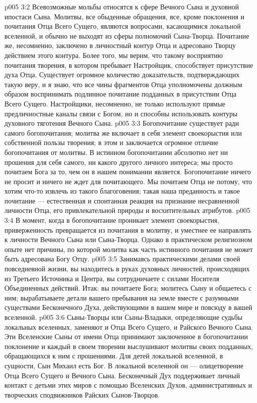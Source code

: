 \vs p005 3:2 Всевозможные мольбы относятся к сфере Вечного Сына и духовной ипостаси Сына. Молитвы, все обыденные обращения, все, кроме поклонения и почитания Отца Всего Сущего, являются вопросами, касающимися локальной вселенной, и обычно не выходят из сферы полномочий Сына\hyp{}Творца. Почитание же, несомненно, заключено в личностный контур Отца и адресовано Творцу действием этого контура. Более того, мы верим, что такому восприятию почитания творения, в котором пребывает Настройщик, способствует присутствие духа Отца. Существует огромное количество доказательств, подтверждающих такую веру, и я знаю, что все чины фрагментов Отца уполномочены должным образом воспринимать подлинное почитание подданных в присутствии Отца Всего Сущего. Настройщики, несомненно, не только используют прямые предличностные каналы связи с Богом, но и способны использовать контуры духовного тяготения Вечного Сына.
\vs p005 3:3 Богопочитание существует ради самого богопочитания; молитва же включает в себя элемент своекорыстия или собственной пользы творения; в этом и заключается огромное отличие богопочитания от молитвы. В истинном богопочитании абсолютно нет ни прошения для себя самого, ни какого другого личного интереса; мы просто почитаем Бога за то, чем он в нашем понимании является. Богопочитание ничего не просит и ничего не ждет для почитающего. Мы почитаем Отца не потому, что хотим что\hyp{}то извлечь из такого благоговения; такая наша преданность и такое почитание --- естественная и спонтанная реакция на признание несравненной личности Отца, его привлекательной природы и восхитительных атрибутов.
\vs p005 3:4 В момент, когда в богопочитание проникает элемент своекорыстия, приверженность превращается из почитания в молитву, и уместнее ее направлять к личности Вечного Сына или Сына\hyp{}Творца. Однако в практическом религиозном опыте нет причины, по которой молитва как часть истинного почитания не может быть адресована Богу Отцу.
\vs p005 3:5 Занимаясь практическими делами своей повседневной жизни, вы находитесь в руках духовных личностей, происходящих из Третьего Источника и Центра, вы сотрудничаете с силами Носителя Объединенных действий. Итак: вы почитаете Бога; молитесь Сыну и общаетесь с ним; вырабатываете детали вашего пребывания на земле вместе с разумными существами Бесконечного Духа, действующими в вашем мире и повсюду в вашей вселенной.
\vs p005 3:6 \pc Сыны\hyp{}Творцы или Сыны\hyp{}Владыки, определяющие судьбы локальных вселенных, заменяют и Отца Всего Сущего, и Райского Вечного Сына. Эти Вселенские Сыны от имени Отца принимают заключенное в богопочитании поклонение и каждый в своем творении выслушивают молитвы своих подданных, обращающихся к ним с прошениями. Для детей локальной вселенной, в сущности, Сын Михаил есть Бог. В локальной вселенной он --- олицетворение Отца Всего Сущего и Вечного Сына. Бесконечный Дух поддерживает личный контакт с детьми этих миров с помощью Вселенских Духов, административных и творческих сподвижников Райских Сынов\hyp{}Творцов.

